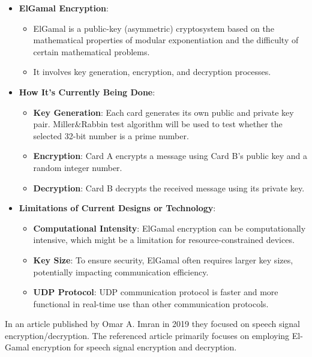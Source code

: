 \documentclass[12pt]{article}
\begin{document}
	\begin{itemize}
		\item \textbf{ElGamal Encryption}:
		\begin{itemize}
			\item ElGamal is a public-key (asymmetric) cryptosystem based on the mathematical properties of modular exponentiation and the difficulty of certain mathematical problems.\cite{book}  \cite{iceis04}
			\item It involves key generation, encryption, and decryption processes.
		\end{itemize}
		
		\item \textbf{How It's Currently Being Done}:
		\begin{itemize}
			\item \textbf{Key Generation}: Each card generates its own public and private key pair.  Miller\&Rabbin test algorithm will be used to test whether the selected 32-bit number is a prime number. \cite{article_369778}
			\item \textbf{Encryption}: Card A encrypts a message using Card B's public key and a random integer number.
			\item \textbf{Decryption}: Card B decrypts the received message using its private key.
		\end{itemize}
		
		\item \textbf{Limitations of Current Designs or Technology}:
		\begin{itemize}
			\item \textbf{Computational Intensity}: ElGamal encryption can be computationally intensive, which might be a limitation for resource-constrained devices.
			\item \textbf{Key Size}: To ensure security, ElGamal often requires larger key sizes, potentially impacting communication efficiency.
			\item \textbf{UDP Protocol}: UDP communication protocol is faster and more functional in real-time use than other communication protocols. \cite{al2018performance}
		\end{itemize}
	\end{itemize}
		
		
		In an article published by Omar A. Imran in 2019\cite{IMRAN20201028} they focused on speech signal encryption/decryption.	The referenced article primarily focuses on employing El-Gamal encryption for speech signal encryption and decryption. 
		 
\end{document}
